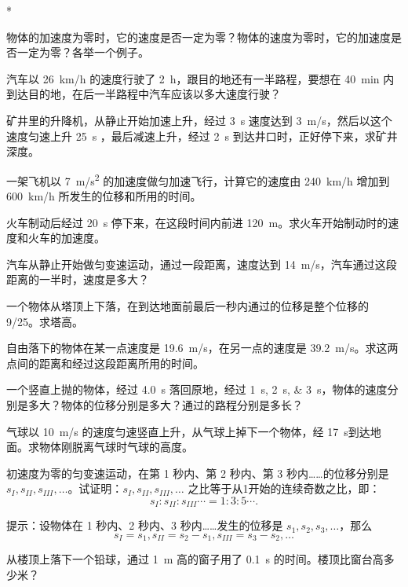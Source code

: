 \begin{Exercise}*
\begin{question}
	\item 物体的加速度为零时，它的速度是否一定为零？物体的速度为零时，它的加速度是否一定为零？各举一个例子。
	\item 汽车以 \qty{26}{km/h} 的速度行驶了 \qty{2}{h}，跟目的地还有一半路程，要想在 \qty{40}{min} 内到达目的地，在后一半路程中汽车应该以多大速度行驶？
	\item 矿井里的升降机，从静止开始加速上升，经过 \qty{3}{s} 速度达到 \qty{3}{m/s}，然后以这个速度匀速上升 \qty{25}{s} ，最后减速上升，经过 \qty{2}{s} 到达井口时，正好停下来，求矿井深度。
	\item 一架飞机以 \qty{7}{m/s^2} 的加速度做匀加速飞行，计算它的速度由 \qty{240}{km/h} 增加到 \qty{600}{km/h} 所发生的位移和所用的时间。
	\item 火车制动后经过 \qty{20}{s} 停下来，在这段时间内前进 \qty{120}{m}。求火车开始制动时的速度和火车的加速度。
	\item 汽车从静止开始做匀变速运动，通过一段距离，速度达到 \qty{14}{m/s}，汽车通过这段距离的一半时，速度是多大？
	\item 一个物体从塔顶上下落，在到达地面前最后一秒内通过的位移是整个位移的 9/25。求塔高。
	\item 自由落下的物体在某一点速度是 \qty{19.6}{m/s}，在另一点的速度是 \qty{39.2}{m/s}。求这两点间的距离和经过这段距离所用的时间。
	\item 一个竖直上抛的物体，经过 \qty{4.0}{s} 落回原地，经过 \qtylist{1;2;3}{s}，物体的速度分别是多大？物体的位移分别是多大？通过的路程分别是多长？
	\item 气球以 \qty{10}{m/s} 的速度匀速竖直上升，从气球上掉下一个物体，经 \qty{17}{s}到达地面。求物体刚脱离气球时气球的高度。
	\item 初速度为零的匀变速运动，在第 1 秒内、第 2 秒内、第 
	3 秒内……的位移分别是 $s_I,s_{II},s_{III},\ldots$。试证明：$s_I,s_{II},s_{III},\ldots$ 之比等于从1开始的连续奇数之比，即：
\[s_I:s_{II}:s_{III}\cdots=1:3:5\cdots.\]

\noindent 提示：设物体在 1 秒内、2 秒内、3 秒内……发生的位移是 $s_1,s_2,s_3,\ldots$，那么 $$s_I=s_1, s_{II}=s_2-s_1, s_{III}=s_3-s_2,\ldots$$
	\item 从楼顶上落下一个铅球，通过 \qty{1}{m} 高的窗子用了 \qty{0.1}{s} 的时间。楼顶比窗台高多少米？
\end{question}
\end{Exercise}